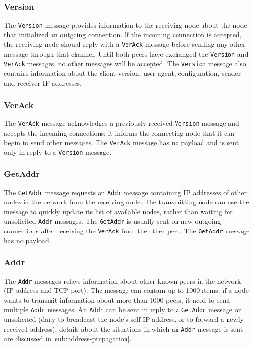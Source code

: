 \subsubsection{Version}
\label{par:version}
The \texttt{Version} message provides information to the receiving node about the node that initialized an outgoing connection.
If the incoming connection is accepted, the receiving node should reply with a \texttt{VerAck} message before sending any other message through that channel.
Until both peers have exchanged the \texttt{Version} and \texttt{VerAck} messages, no other messages will be accepted.
The \texttt{Version} message also contains information about the client version, user-agent, configuration, sender and receiver IP addresses.

\subsubsection{VerAck}
The \texttt{VerAck} message acknowledges a previously received \texttt{Version} message and accepts the incoming connections:
it informs the connecting node that it can begin to send other messages.
The \texttt{VerAck} message has no payload and is sent only in reply to a \texttt{Version} message.

\subsubsection{GetAddr}
The \texttt{GetAddr} message requests an \texttt{Addr} message containing IP addresses of other nodes in the network from the receiving node.
The transmitting node can use the message to quickly update its list of available nodes, rather than waiting for unsolicited \texttt{Addr} messages.
The \texttt{GetAddr} is usually sent on new outgoing connections after receiving the \texttt{VerAck} from the other peer.
The \texttt{GetAddr} message has no payload.

\subsubsection{Addr}
The \texttt{Addr} messages relays information about other known peers in the network (IP address and TCP port).
The message can contain up to \num{1000} items:
if a node wants to transmit information about more than \num{1000} peers, it need to send multiple \texttt{Addr} messages.
An \texttt{Addr} can be sent in reply to a \texttt{GetAddr} message or unsolicited (daily to broadcast the node's self IP address, or to forward a newly received address):
details about the situations in which an \texttt{Addr} message is sent are discussed in \cref{sub:address-propagation}.

